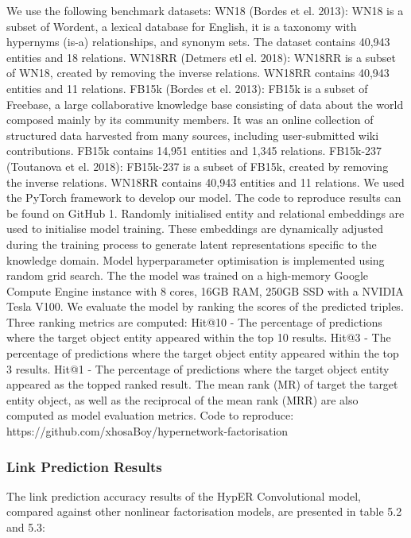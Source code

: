 We use the following benchmark datasets: WN18 (Bordes et el. 2013): WN18 is a subset of Wordent, a lexical database for English, it is a taxonomy with hypernyms (is-a) relationships, and synonym sets. The dataset contains 40,943 entities and 18 relations. WN18RR (Detmers etl el. 2018): WN18RR is a subset of WN18, created by removing the inverse relations. WN18RR contains 40,943 entities and 11 relations. \newline 
FB15k (Bordes et el. 2013): FB15k is a subset of Freebase, a large collaborative knowledge base consisting of data about the world composed mainly by its community members. It was an online collection of structured data harvested from many sources, including user-submitted wiki contributions. FB15k contains 14,951 entities and 1,345 relations. FB15k-237 (Toutanova et el. 2018): FB15k-237 is a subset of FB15k, created by removing the inverse relations. WN18RR contains 40,943 entities and 11 relations. \newline
We used the PyTorch framework to develop our model. The code to reproduce results can be found on GitHub 1. Randomly initialised entity and relational embeddings are used to initialise model training. These embeddings are dynamically adjusted during the training process to generate latent representations specific to the knowledge domain. Model hyperparameter optimisation is implemented using random grid search. The the model was trained on a high-memory Google Compute Engine instance with 8 cores, 16GB RAM, 250GB SSD with a NVIDIA Tesla V100. \newline
We evaluate the model by ranking the scores of the predicted triples. Three ranking metrics are computed: Hit@10 - The percentage of predictions where the target object entity appeared within the top 10 results. Hit@3 - The percentage of predictions where the target object entity appeared within the top 3 results. Hit@1 - The percentage of predictions where the target object entity appeared as the topped ranked result. The mean rank (MR) of target the target entity object, as well as the reciprocal of the mean rank (MRR) are also computed as model evaluation metrics. Code to reproduce: https://github.com/xhosaBoy/hypernetwork-factorisation

\subsubsection{Link Prediction Results}
The link prediction accuracy results of the HypER Convolutional model, compared against other nonlinear factorisation models, are presented in table 5.2 and 5.3:


